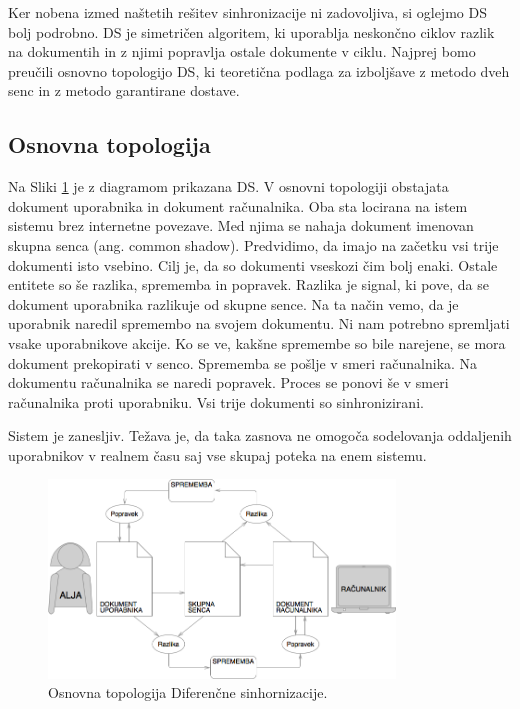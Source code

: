 \documentclass[a4paper, 12pt, twoside]{book}
\begin{document}
Ker nobena izmed naštetih rešitev sinhronizacije ni zadovoljiva, si oglejmo DS bolj podrobno. DS je simetričen algoritem, ki uporablja neskončno ciklov razlik na dokumentih in z njimi popravlja ostale dokumente v ciklu. Najprej bomo preučili osnovno topologijo DS, ki teoretična podlaga za izboljšave z metodo dveh senc in z metodo garantirane dostave.

\subsection{Osnovna topologija}

Na Sliki \ref{ds1} je z diagramom prikazana DS. V osnovni topologiji obstajata dokument uporabnika in dokument računalnika. Oba sta locirana na istem sistemu brez internetne povezave. Med njima se nahaja dokument imenovan skupna senca (ang. common shadow). Predvidimo, da imajo na začetku vsi trije dokumenti isto vsebino. Cilj je, da so dokumenti vseskozi čim bolj enaki. Ostale entitete so še razlika, sprememba in popravek. Razlika je signal, ki pove, da se dokument uporabnika razlikuje od skupne sence. Na ta način vemo, da je uporabnik naredil spremembo na svojem dokumentu. Ni nam potrebno spremljati vsake uporabnikove akcije. Ko se ve, kakšne spremembe so bile narejene, se mora dokument prekopirati v senco. Sprememba se pošlje v smeri računalnika. Na dokumentu računalnika se naredi popravek. Proces se ponovi še v smeri računalnika proti uporabniku. Vsi trije dokumenti so sinhronizirani.

Sistem je zanesljiv. Težava je, da taka zasnova ne omogoča sodelovanja oddaljenih uporabnikov v realnem času saj vse skupaj poteka na enem sistemu.

\begin{figure}[placement h]
\begin{center}
\includegraphics[width=9.2cm]{ds1.png}
\end{center}
\caption{Osnovna topologija Diferenčne sinhornizacije.}
\label{ds1}
\end{figure}
\end{document}
